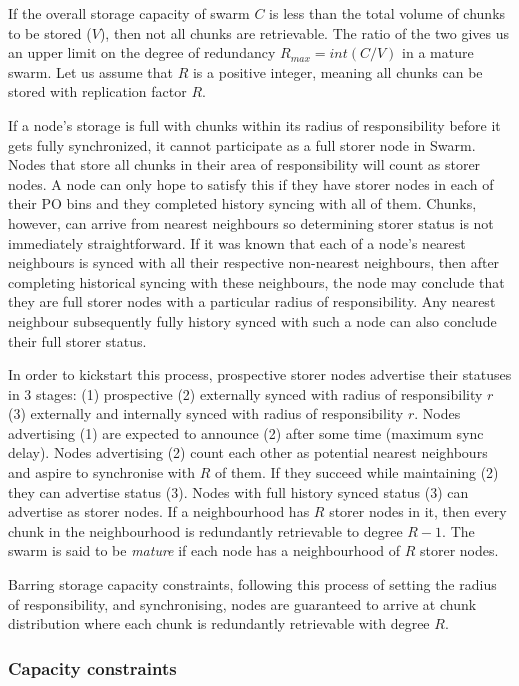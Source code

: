 If the overall storage capacity of swarm $C$ is less than the total volume of chunks to be stored ($V$), then not all chunks are retrievable. The ratio of the two gives us an upper limit on the degree of redundancy $R_{\mathit{max}} = \mathit{int}(C/V)$ in a mature swarm.
Let us assume that $R$ is a positive integer, meaning all chunks can be stored with replication factor $R$.

If a node's storage is full with chunks within its radius of responsibility before it gets fully synchronized, it cannot participate as a full storer node in Swarm.
Nodes that store all chunks in their area of responsibility will count as storer nodes. A node can only hope to satisfy this if they have storer nodes in each of their PO bins and they completed history syncing with all of them. Chunks, however, can arrive from nearest neighbours so determining storer status is not immediately straightforward. 
If it was known that each of a node's nearest neighbours is synced with all their respective non-nearest neighbours, then after completing historical syncing with these neighbours, the node may conclude that they are full storer nodes with a particular radius of responsibility. Any nearest neighbour subsequently fully history synced with such a node can also conclude their full storer status. 

In order to kickstart this process, prospective storer nodes advertise their statuses in 3 stages: (1) prospective (2) externally synced with radius of responsibility $r$ (3) externally and internally synced with radius of responsibility $r$.
Nodes advertising (1) are expected to announce (2) after some time (maximum sync delay). 
Nodes advertising (2) count each other as potential nearest neighbours and aspire to synchronise with $R$ of them. If they succeed while maintaining (2) they can advertise status (3). Nodes with full history synced status (3) can advertise as storer nodes.  If a neighbourhood has $R$ storer nodes in it, then every chunk in the neighbourhood is redundantly retrievable to degree $R-1$. The swarm is said to be \emph{mature} if each node has a neighbourhood of $R$ storer nodes.%

Barring storage capacity constraints, following this process of setting the radius of responsibility, and synchronising, nodes are  guaranteed to arrive at chunk distribution where each chunk is redundantly retrievable with degree $R$.

\subsubsection{Capacity constraints}

